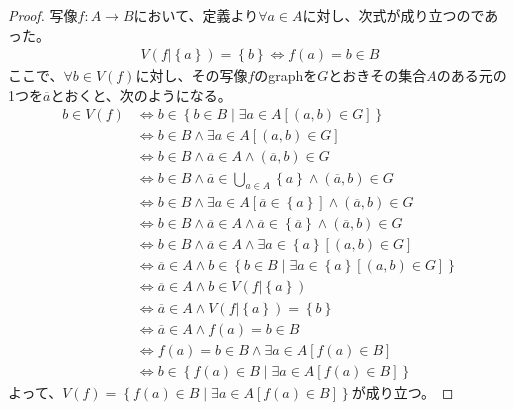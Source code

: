 \documentclass[dvipdfmx]{jsarticle}
\begin{document}
\begin{proof}
写像$f:A \rightarrow B$において、定義より$\forall a \in A$に対し、次式が成り立つのであった。
\begin{align*}
V\left( f|\left\{ a \right\} \right) = \left\{ b \right\} \Leftrightarrow f(a) = b \in B
\end{align*}
ここで、$\forall b \in V(f)$に対し、その写像$f$のgraphを$G$とおきその集合$A$のある元の1つを$\overline{a}$とおくと、次のようになる。
\begin{align*}
b \in V(f) &\Leftrightarrow b \in \left\{ b \in B \middle| \exists a \in A\left[ (a,b) \in G \right] \right\}\\
&\Leftrightarrow b \in B \land \exists a \in A\left[ (a,b) \in G \right]\\
&\Leftrightarrow b \in B \land \overline{a} \in A \land \left( \overline{a},b \right) \in G\\
&\Leftrightarrow b \in B \land \overline{a} \in \bigcup_{a \in A} \left\{ a \right\} \land \left( \overline{a},b \right) \in G\\
&\Leftrightarrow b \in B \land \exists a \in A\left[ \overline{a} \in \left\{ a \right\} \right] \land \left( \overline{a},b \right) \in G\\
&\Leftrightarrow b \in B \land \overline{a} \in A \land \overline{a} \in \left\{ \overline{a} \right\} \land \left( \overline{a},b \right) \in G\\
&\Leftrightarrow b \in B \land \overline{a} \in A \land \exists a \in \left\{ a \right\}\left[ (a,b) \in G \right]\\
&\Leftrightarrow \overline{a} \in A \land b \in \left\{ b \in B \middle| \exists a \in \left\{ a \right\}\left[ (a,b) \in G \right] \right\}\\
&\Leftrightarrow \overline{a} \in A \land b \in V\left( f|\left\{ a \right\} \right)\\
&\Leftrightarrow \overline{a} \in A \land V\left( f|\left\{ a \right\} \right) = \left\{ b \right\}\\
&\Leftrightarrow \overline{a} \in A \land f(a) = b \in B\\
&\Leftrightarrow f(a) = b \in B \land \exists a \in A\left[ f(a) \in B \right]\\
&\Leftrightarrow b \in \left\{ f(a) \in B \middle| \exists a \in A\left[ f(a) \in B \right] \right\}
\end{align*}
よって、$V(f) = \left\{ f(a) \in B \middle| \exists a \in A\left[ f(a) \in B \right] \right\}$が成り立つ。
\end{proof}
\end{document}
